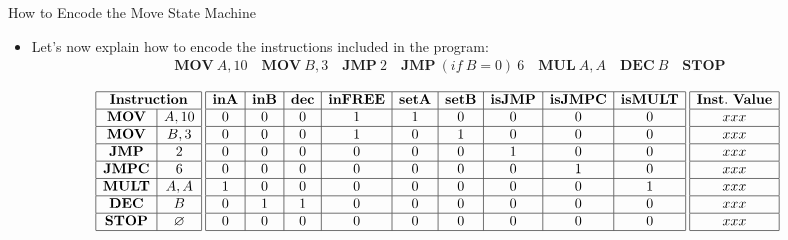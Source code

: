 \begin{frame}[allowframebreaks]{How to Encode the Move State Machine}
\begin{itemize}
\item Let's now explain how to encode the instructions included in the program:
\begin{align*}
\mathbf{MOV}~A, 10 \quad \mathbf{MOV}~B, 3 \quad \mathbf{JMP}~2 \quad \mathbf{JMP}~(if~B = 0)~6 \quad \mathbf{MUL}~A, A \quad \mathbf{DEC}~B \quad \mathbf{STOP}
\end{align*}
\end{itemize}
\small
\[
\begin{array}{|c|c|}
\hline
\multicolumn{2}{|c|}{\mathbf{Instruction}} \\ \hline
\mathbf{MOV} & A, 10 \\ \hline
\mathbf{MOV} & B, 3 \\ \hline
\mathbf{JMP} & 2 \\ \hline
\mathbf{JMPC} & 6 \\ \hline
\mathbf{MULT} & A, A \\ \hline
\mathbf{DEC} & B \\ \hline
\mathbf{STOP} & \emptyset \\ \hline
\end{array}
\hspace{0.1cm}
\begin{array}{|c|c|c|c|c|c|c|c|c|}
\hline
\textbf{inA} & \textbf{inB} & \textbf{dec} & \textbf{inFREE} & \textbf{setA} & \textbf{setB} & \textbf{isJMP} & \textbf{isJMPC} & \textbf{isMULT} \\ \hline
0 & 0 & 0 & 1 & 1 & 0 & 0 & 0 & 0 \\ \hline
0 & 0 & 0 & 1 & 0 & 1 & 0 & 0 & 0 \\ \hline
0 & 0 & 0 & 0 & 0 & 0 & 1 & 0 & 0 \\ \hline
0 & 0 & 0 & 0 & 0 & 0 & 0 & 1 & 0 \\ \hline
1 & 0 & 0 & 0 & 0 & 0 & 0 & 0 & 1 \\ \hline
0 & 1 & 1 & 0 & 0 & 0 & 0 & 0 & 0 \\ \hline
0 & 0 & 0 & 0 & 0 & 0 & 0 & 0 & 0 \\ \hline
\end{array}
\hspace{0.1cm}
\begin{array}{|c|}
\hline
\mathbf{Inst.~Value} \\ \hline
xxx \\ \hline
xxx \\ \hline
xxx \\ \hline
xxx \\ \hline
xxx \\ \hline
xxx \\ \hline
xxx \\ \hline
\end{array}
\]


\end{frame}
